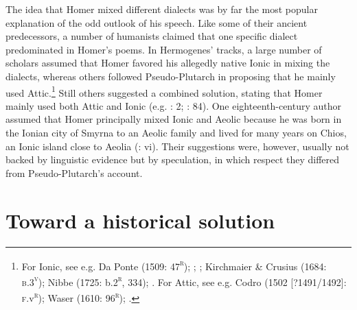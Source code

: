 The idea that Homer mixed different dialects was by far the most popular explanation of the odd outlook of his speech. Like some of their ancient predecessors, a number of humanists claimed that one specific dialect predominated in Homer’s poems. In Hermogenes’ tracks, a large number of scholars assumed that Homer favored his allegedly native Ionic in mixing the dialects, whereas others followed Pseudo-Plutarch in proposing that he mainly used Attic.\footnote{For Ionic, see e.g. Da Ponte (1509: 47\textsc{\textsuperscript{r}}); \citet[215]{Ringelbergh1541}; \citet[167]{Labbe1639}; Kirchmaier \& Crusius (1684: \textsc{b.3}\textsc{\textsuperscript{v}}); Nibbe (1725: b.2\textsc{\textsuperscript{r}}, 334); \citet[161]{Gesner1774}. For Attic, see e.g. Codro (1502 [?1491/1492]: \textsc{f.}v\textsc{\textsuperscript{r}}); Waser (1610: 96\textsc{\textsuperscript{r}}); \citet[514]{Fabricius1711}.} Still others suggested a combined solution, stating that Homer mainly used both Attic and Ionic (e.g. \citealt{Schmidt1604}: 2; \citealt{Rhenius1626}: 84). One eighteenth-century author assumed that Homer principally mixed Ionic and Aeolic because he was born in the Ionian city of Smyrna to an Aeolic family and lived for many years on Chios, an Ionic island close to Aeolia (\citealt{Reynolds1752}: vi). Their suggestions were, however, usually not backed by linguistic evidence but by speculation, in which respect they differed from Pseudo-Plutarch’s account.

\section{Toward a historical solution}

